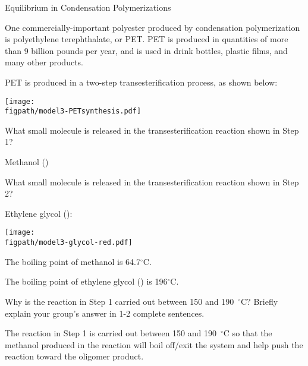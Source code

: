 \begin{activity}{Equilibrium in Condensation Polymerizations}
\begin{model}
One commercially-important polyester produced by condensation polymerization is polyethylene terephthalate, or PET.
PET is produced in quantities of more than 9 billion pounds per year, and is used in drink bottles, plastic films, and many other products.

PET is produced in a two-step transesterification process, as shown below:
	
		\vspace{0.1in}
		\centerline{\texttt{[image: \\figpath/model3-PETsynthesis.pdf]}}

\end{model}

\begin{ctqs}
		

			
		\question What small molecule is released in the transesterification reaction shown in Step 1?
		
			\begin{solution}[0.75in]{}
				Methanol ()
			\end{solution}
		
		\question What small molecule is released in the transesterification reaction shown in Step 2?
		
			\begin{solution}[0.75in]{}
				Ethylene glycol (\ce{HOCH2CH2OH}):
				
				\centerline{\texttt{[image: \\figpath/model3-glycol-red.pdf]}}
			\end{solution}
			
\end{ctqs}

\begin{infobox}
	
	The boiling point of methanol is 64.7${}^\circ$C.
	
	The boiling point of ethylene glycol () is 196${}^\circ$C.
	
\end{infobox}

\begin{ctqs}
	
	\question Why is the reaction in Step 1 carried out between 150 and 190~${}^\circ$C?  Briefly explain your group's answer in 1-2 complete sentences.
	
		\begin{solution}[1.25in]{}
			The reaction in Step 1 is carried out between 150 and 190~${}^\circ$C so that the methanol produced in the reaction will boil off/exit the system and help push the reaction toward the oligomer product.
		\end{solution}
	

\end{ctqs}
\end{activity}

